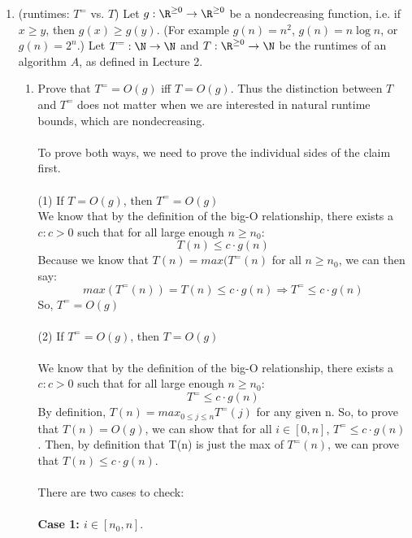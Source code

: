 \documentclass[11pt]{article}
\begin{document}
\begin{enumerate}
\begin{enumerate}
    \item  (runtimes: $T^=$ vs. $T$)  
    Let $g : \R^{\geq 0}\rightarrow \R^{\geq 0}$ be a nondecreasing function, i.e. if $x\geq y$, then $g(x)\geq g(y)$. (For example $g(n)=n^2$, $g(n)=n\log n$, or $g(n)=2^n$.) Let $T^{=} : \N\rightarrow \N$ and $T : \R^{\geq 0}\rightarrow \N$ be the runtimes of an algorithm $A$, as defined in Lecture 2. 
    \begin{enumerate}   
    \item Prove that $T^{=}=O(g)$ iff $T=O(g)$. Thus the distinction between $T$ and $T^{=}$ does not matter when we are interested in natural runtime bounds, which are nondecreasing. 
    \\
    \\ To prove both ways, we need to prove the individual sides of the claim first.
    \\\\ (1) If $T = O(g)$, then $T^{=}=O(g)$
    \\ We know that by the definition of the big-O relationship, there exists a $c : c > 0$ such that for all large enough $n \geq n_0$:
    \begin{equation*}
        T(n) \leq c \cdot g(n)
    \end{equation*}
    Because we know that $T(n) = max(T^{=}(n)$ for all $n \geq n_0$, we can then say:
    \begin{equation*}
        max(T^{=}(n)) = T(n) \leq c \cdot g(n)
        \Rightarrow T^{=} \leq c \cdot g(n)
    \end{equation*}
    So, $T^{=}=O(g)$
    \\\\
    (2) If $T^{=}=O(g)$, then $T=O(g)$
    \\\\
    We know that by the definition of the big-O relationship, there exists a $c : c > 0$ such that for all large enough $n \geq n_0$:
    \begin{equation*}
        T^{=} \leq c \cdot g(n)
    \end{equation*}
    By definition, $T(n) = max_{0\leq j \leq n}T^{=}(j)$ for any given n. So, to prove that $T(n) = O(g)$, we can show that for all $i \in [0, n]$, $ T^{=} \leq c \cdot g(n)$. Then, by definition that T(n) is just the max of $T^{=}(n)$, we can prove that $T(n) \leq c \cdot g(n)$.
    \\\\ There are two cases to check:
    \\\\ \textbf{Case 1: $i \in [n_0, n]$}. 

\end{enumerate}
\end{enumerate}
\end{enumerate}
\end{document}

